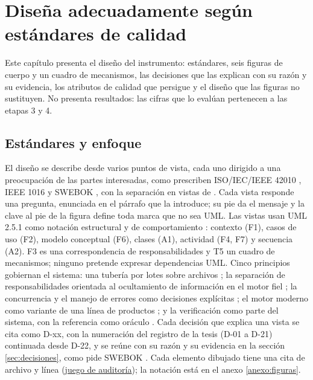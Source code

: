 \chapter[Diseña adecuadamente según estándares de calidad][Diseña según estándares de calidad]{Diseña adecuadamente según estándares de calidad}
\label{cap:diseno}

Este capítulo presenta el diseño del instrumento: estándares, seis figuras de cuerpo y un cuadro de mecanismos, las decisiones
que las explican con su razón y su evidencia, los atributos de calidad que persigue y el diseño
que las figuras no sustituyen. No presenta resultados: las cifras que lo evalúan pertenecen a
las etapas 3 y 4.

\section{Estándares y enfoque}
\label{sec:estandares}

El diseño se describe desde varios puntos de vista, cada uno dirigido a una preocupación de
las partes interesadas, como prescriben ISO/IEC/IEEE 42010 \parencite{iso42010}, IEEE 1016
\parencite{ieee1016} y SWEBOK \parencite[cap.~2, §2.1]{swebok2025}, con la separación en vistas
de \textcite{kruchten1995views}. Cada vista responde una pregunta, enunciada en el párrafo que
la introduce; su pie da el mensaje y la clave al pie de la figura define toda marca que no sea
UML. Las vistas usan UML 2.5.1 \parencite{omg_uml251} como notación estructural y de
comportamiento \parencite[cap.~11, §2]{swebok2025}: contexto (F1), casos de uso (F2), modelo conceptual
(F6), clases (A1), actividad (F4, F7) y secuencia (A2). F3 es una correspondencia de
responsabilidades y T5 un cuadro de mecanismos; ninguno pretende expresar dependencias UML. Cinco
principios gobiernan el sistema: una tubería por lotes sobre archivos \parencite[cap.~2,
§2.2]{swebok2025}; la separación de responsabilidades orientada al ocultamiento de información \parencite{parnas1972criteria} en el motor
fiel \parencite[cap.~3, §1.4]{swebok2025}; la concurrencia y el manejo de errores como
decisiones explícitas \parencite[cap.~3, §3.1 y §3.5]{swebok2025}; el motor moderno como
variante de una línea de productos \parencite[cap.~3, §3.8]{swebok2025}; y la verificación
como parte del sistema, con la referencia como oráculo \parencite[cap.~5, §1.2.7]{swebok2025}.
Cada decisión que explica una vista se cita como D-xx, con la numeración del registro de la
tesis (D-01 a D-21) continuada desde D-22, y se reúne con su razón y su evidencia en la sección
\ref{sec:decisiones}, como pide SWEBOK \parencite[cap.~3, §4.6]{swebok2025}. Cada elemento
dibujado tiene una cita de archivo y línea (\href{run:../figuras/FACTS.md}{juego de auditoría});
la notación está en el anexo \ref{anexo:figuras}.

